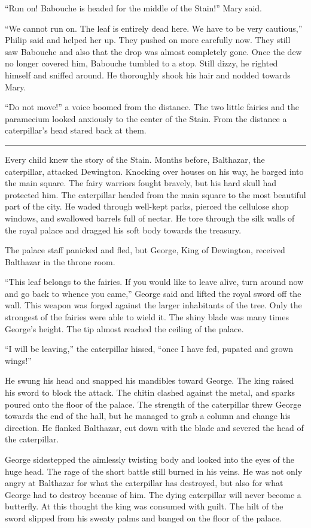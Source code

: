 \documentclass[10pt, draft]{memoir}
\renewcommand{\pfbreakdisplay}{\bigskip \ding{166} \bigskip}
\newcommand{\secbreak}{\fancybreak{\pfbreakdisplay}}
\begin{document}
``Run on! Babouche is headed for the middle of the Stain!'' Mary said.

``We cannot run on. The leaf is entirely dead here. We have to be very
cautious,'' Philip said and helped her up. They pushed on more carefully now.
They still saw Babouche and also that the drop was almost completely gone. Once
the dew no longer covered him, Babouche tumbled to a stop. Still dizzy, he
righted himself and sniffed around. He thoroughly shook his hair and nodded
towards Mary.

``Do not move!'' a voice boomed from the distance. The two little fairies and
the paramecium looked anxiously to the center of the Stain. From the distance a
caterpillar's head stared back at them.

\secbreak

Every child knew the story of the Stain. Months before, Balthazar, the
caterpillar, attacked Dewington. Knocking over houses on his way, he barged
into the main square. The fairy warriors fought bravely, but his hard skull
had protected him. The caterpillar headed from the main square to the most
beautiful part of the city. He waded through well-kept parks, pierced the
cellulose shop windows, and swallowed barrels full of nectar. He tore through
the silk walls of the royal palace and dragged his soft body towards the
treasury.

The palace staff panicked and fled, but George, King of Dewington, received
Balthazar in the throne room.

``This leaf belongs to the fairies. If you would like to leave alive, turn
around now and go back to whence you came,'' George said and lifted the royal
sword off the wall. This weapon was forged against the larger inhabitants of
the tree. Only the strongest of the fairies were able to wield it. The shiny
blade was many times George's height. The tip almost reached the ceiling of the
palace.

``I will be leaving,'' the caterpillar hissed, ``once I have fed, pupated and
grown wings!''

He swung his head and snapped his mandibles toward George. The king raised his
sword to block the attack. The chitin clashed against the metal, and sparks
poured onto the floor of the palace. The strength of the caterpillar threw
George towards the end of the hall, but he managed to grab a column and change
his direction. He flanked Balthazar, cut down with the blade and severed the
head of the caterpillar.

George sidestepped the aimlessly twisting body and looked into the eyes of the
huge head. The rage of the short battle still burned in his veins. He was not
only angry at Balthazar for what the caterpillar has destroyed, but also for
what George had to destroy because of him. The dying caterpillar will never
become a butterfly. At this thought the king was consumed with guilt. The hilt
of the sword slipped from his sweaty palms and banged on the floor of the
palace.
\end{document}
